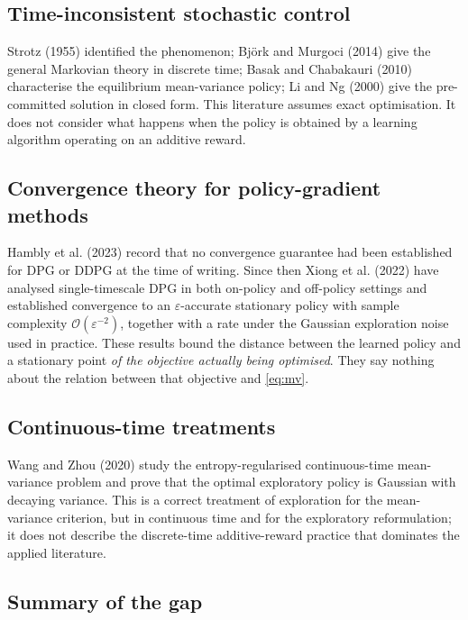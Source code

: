 \documentclass[11pt,a4paper]{article}
\theoremstyle{plain}
\theoremstyle{definition}
\begin{document}
\subsection{Time-inconsistent stochastic control}

Strotz (1955) identified the phenomenon; Björk and Murgoci (2014) give the
general Markovian theory in discrete time; Basak and Chabakauri (2010) characterise the
equilibrium mean-variance policy; Li and Ng (2000) give the pre-committed solution
in closed form. This literature assumes exact optimisation. It does not consider what
happens when the policy is obtained by a learning algorithm operating on an additive
reward.

\subsection{Convergence theory for policy-gradient methods}

Hambly et al. (2023) record that no convergence guarantee had been established for
DPG or DDPG at the time of writing. Since then Xiong et al. (2022) have analysed
single-timescale DPG in both on-policy and off-policy settings and established
convergence to an $\varepsilon$-accurate stationary policy with sample complexity
$\mathcal{O}(\varepsilon^{-2})$, together with a rate under the Gaussian exploration
noise used in practice. These results bound the distance between the learned policy and
a stationary point \emph{of the objective actually being optimised}. They say nothing
about the relation between that objective and \eqref{eq:mv}.

\subsection{Continuous-time treatments}

Wang and Zhou (2020) study the entropy-regularised continuous-time mean-variance
problem and prove that the optimal exploratory policy is Gaussian with decaying
variance. This is a correct treatment of exploration for the mean-variance criterion,
but in continuous time and for the exploratory reformulation; it does not describe the
discrete-time additive-reward practice that dominates the applied literature.

\subsection{Summary of the gap}
\end{document}
